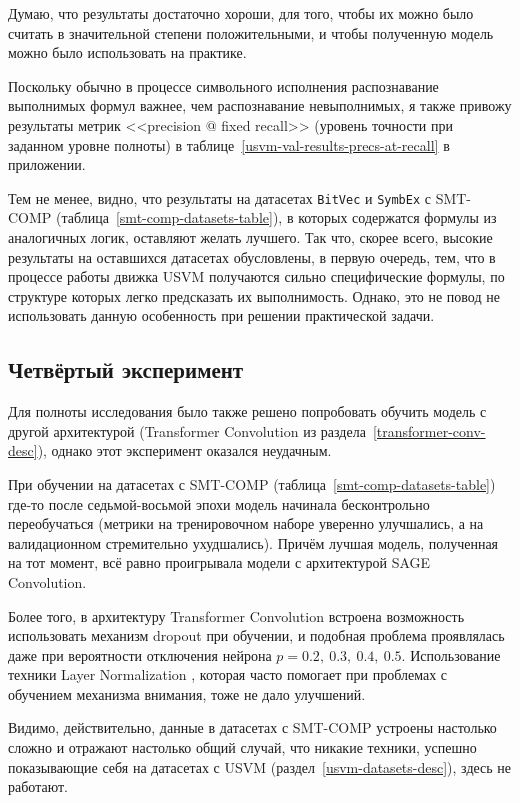 
Думаю, что результаты достаточно хороши, для того, чтобы их можно было считать в значительной степени положительными, и чтобы полученную модель можно было использовать на практике.

Поскольку обычно в процессе символьного исполнения распознавание выполнимых формул важнее, чем распознавание невыполнимых, я также привожу результаты метрик <<precision @ fixed recall>> (уровень точности при заданном уровне полноты) в таблице~\ref{usvm-val-results-precs-at-recall} в приложении.

Тем не менее, видно, что результаты на датасетах \texttt{BitVec} и \texttt{SymbEx} с SMT-COMP (таблица~\ref{smt-comp-datasets-table}), в которых содержатся формулы из аналогичных логик, оставляют желать лучшего. Так что, скорее всего, высокие результаты на оставшихся датасетах обусловлены, в первую очередь, тем, что в процессе работы движка USVM получаются сильно специфические формулы, по структуре которых легко предсказать их выполнимость. Однако, это не повод не использовать данную особенность при решении практической задачи.

\subsection{Четвёртый эксперимент}

Для полноты исследования было также решено попробовать обучить модель с другой архитектурой (Transformer Convolution из раздела~\ref{transformer-conv-desc}), однако этот эксперимент оказался неудачным.

При обучении на датасетах с SMT-COMP (таблица~\ref{smt-comp-datasets-table}) где-то после седьмой-восьмой эпохи модель начинала бесконтрольно переобучаться (метрики на тренировочном наборе уверенно улучшались, а на валидационном стремительно ухудшались). Причём лучшая модель, полученная на тот момент, всё равно проигрывала модели с архитектурой SAGE Convolution.

Более того, в архитектуру Transformer Convolution встроена возможность использовать механизм dropout \cite{dropout-paper} при обучении, и подобная проблема проявлялась даже при вероятности отключения нейрона $p = 0.2, \ 0.3, \ 0.4, \ 0.5$. Использование техники Layer Normalization \cite{layer-norm-paper}, которая часто помогает при проблемах с обучением механизма внимания, тоже не дало улучшений.

Видимо, действительно, данные в датасетах с SMT-COMP устроены настолько сложно и отражают настолько общий случай, что никакие техники, успешно показывающие себя на датасетах с USVM (раздел~\ref{usvm-datasets-desc}), здесь не работают.

